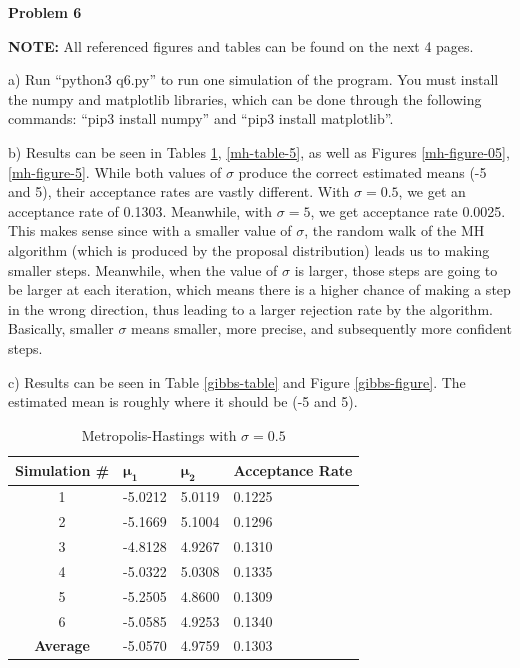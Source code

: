 \textbf{Problem 6}

\textbf{NOTE: }All referenced figures and tables can be found on the next 4 pages.

a) Run ``python3 q6.py'' to run one simulation of the program. You must install the numpy and matplotlib libraries, which can be done through the following commands: ``pip3 install numpy'' and ``pip3 install matplotlib''.

b) Results can be seen in Tables \ref{mh-table-05}, \ref{mh-table-5}, as well as Figures \ref{mh-figure-05}, \ref{mh-figure-5}. While both values of $\sigma$ produce the correct estimated means (-5 and 5), their acceptance rates are vastly different. With $\sigma = 0.5$, we get an acceptance rate of 0.1303. Meanwhile, with $\sigma = 5$, we get acceptance rate 0.0025. This makes sense since with a smaller value of $\sigma$, the random walk of the MH algorithm (which is produced by the proposal distribution) leads us to making smaller steps. Meanwhile, when the value of $\sigma$ is larger, those steps are going to be larger at each iteration, which means there is a higher chance of making a step in the wrong direction, thus leading to a larger rejection rate by the algorithm. Basically, smaller $\sigma$ means smaller, more precise, and subsequently more confident steps.

c) Results can be seen in Table \ref{gibbs-table} and Figure \ref{gibbs-figure}. The estimated mean is roughly where it should be (-5 and 5).

\pagebreak \begin{table}[h]
	\centering
	\begin{tabular}{|c|l|l|l|}
		\hline
		\textbf{Simulation \#} & $\mathbf{\mu_1}$     & $\mathbf{\mu_2}$    & \textbf{Acceptance Rate} \\ \hline
		1 & -5.0212 & 5.0119 & 0.1225               \\ \hline
		2 & -5.1669 & 5.1004 & 0.1296               \\ \hline
		3 & -4.8128 & 4.9267 & 0.1310               \\ \hline
		4 & -5.0322 & 5.0308 & 0.1335               \\ \hline
		5 & -5.2505 & 4.8600 & 0.1309               \\ \hline
		6 & -5.0585 & 4.9253 & 0.1340               \\ \hline
		\textbf{Average} & -5.0570 & 4.9759 & 0.1303               \\ \hline
	\end{tabular}
	\caption{Metropolis-Hastings with $\sigma = 0.5$}
	\label{mh-table-05}
\end{table}

